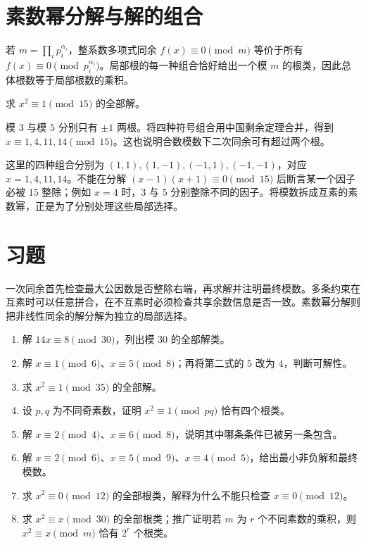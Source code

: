 \documentclass[UTF8,12pt,a4paper,fontset=fandol]{ctexbook}
\begin{document}
\section{素数幂分解与解的组合}

若 $m=\prod_i p_i^{\alpha_i}$，整系数多项式同余 $f(x)\equiv0\pmod m$ 等价于所有 $f(x)\equiv0\pmod{p_i^{\alpha_i}}$。局部根的每一种组合恰好给出一个模 $m$ 的根类，因此总体根数等于局部根数的乘积。

\begin{example}
求 $x^2\equiv1\pmod{15}$ 的全部解。
\end{example}
\begin{solve}
模 $3$ 与模 $5$ 分别只有 $\pm1$ 两根。将四种符号组合用中国剩余定理合并，得到 $x\equiv1,4,11,14\pmod{15}$。这也说明合数模数下二次同余可有超过两个根。
\end{solve}

这里的四种组合分别为 $(1,1),(1,-1),(-1,1),(-1,-1)$，对应 $x=1,4,11,14$。不能在分解 $(x-1)(x+1)\equiv0\pmod{15}$ 后断言某一个因子必被 $15$ 整除；例如 $x=4$ 时，$3$ 与 $5$ 分别整除不同的因子。将模数拆成互素的素数幂，正是为了分别处理这些局部选择。

\section{习题}

一次同余首先检查最大公因数是否整除右端，再求解并注明最终模数。多条约束在互素时可以任意拼合，在不互素时必须检查共享余数信息是否一致。素数幂分解则把非线性同余的解分解为独立的局部选择。

\begin{enumerate}
 \item 解 $14x\equiv8\pmod{30}$，列出模 $30$ 的全部解类。
 \item 解 $x\equiv1\pmod6$、$x\equiv5\pmod8$；再将第二式的 $5$ 改为 $4$，判断可解性。
 \item 求 $x^2\equiv1\pmod{35}$ 的全部解。
 \item 设 $p,q$ 为不同奇素数，证明 $x^2\equiv1\pmod{pq}$ 恰有四个根类。
 \item\label{ex:crt-redundant} 解 $x\equiv2\pmod4$、$x\equiv6\pmod8$，说明其中哪条条件已被另一条包含。
 \item\label{ex:crt-three} 解 $x\equiv2\pmod6$、$x\equiv5\pmod9$、$x\equiv4\pmod5$，给出最小非负解和最终模数。
 \item\label{ex:crt-zero-roots} 求 $x^2\equiv0\pmod{12}$ 的全部根类，解释为什么不能只检查 $x\equiv0\pmod{12}$。
 \item\label{ex:crt-idempotents} 求 $x^2\equiv x\pmod{30}$ 的全部根类；推广证明若 $m$ 为 $r$ 个不同素数的乘积，则 $x^2\equiv x\pmod m$ 恰有 $2^r$ 个根类。
\end{enumerate}
\end{document}
